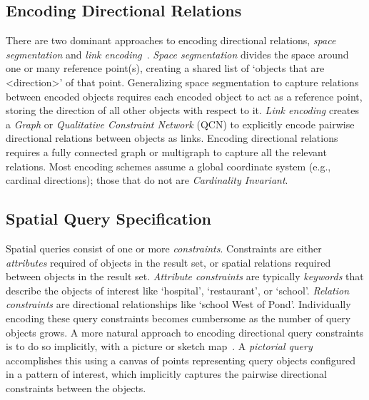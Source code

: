 \subsection{Encoding Directional Relations}
\par{
    There are two dominant approaches to encoding directional relations, \textit{space segmentation} and \textit{link encoding}~\cite{Dellapenna2012, Dellapenna2017}.
    \textit{Space segmentation} divides the space around one or many reference point(s), creating a shared list of `objects that are <direction>' of that point. 
    Generalizing space segmentation to capture relations between encoded objects requires each encoded object to act as a reference point, storing the direction of all other objects with respect to it.
     \textit{Link encoding} creates a \textit{Graph} or \textit{Qualitative Constraint Network} (QCN) to explicitly encode pairwise directional relations between objects as links.
    Encoding directional relations requires a fully connected graph or multigraph to capture all the relevant relations.
    Most encoding schemes assume a global coordinate system (e.g., cardinal directions); those that do not are \textit{Cardinality Invariant}.

}


\subsection{Spatial Query Specification}
\par{
    Spatial queries consist of one or more \textit{constraints}.
    Constraints are either \textit{attributes} required of objects in the result set, or spatial relations required between objects in the result set.
    \textit{Attribute constraints} are typically \textit{keywords} that describe the objects of interest like `hospital', `restaurant', or `school'.
    \textit{Relation constraints} are directional relationships like `school West of Pond'.
    Individually encoding these query constraints becomes cumbersome as the number of query objects grows.
        A more natural approach to encoding directional query constraints is to do so implicitly, with a picture or sketch map~\cite{Osul2023}.
    A \textit{pictorial query} accomplishes this using a canvas of points representing query objects configured in a pattern of interest, which implicitly captures the pairwise directional constraints between the objects. 
    
}


